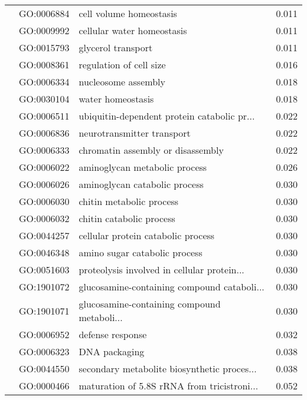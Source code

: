 \begin{longtable}{lllr}
   & GO:0006884 &                      cell volume homeostasis &         0.011 \\
   & GO:0009992 &                   cellular water homeostasis &         0.011 \\
   & GO:0015793 &                           glycerol transport &         0.011 \\
   & GO:0008361 &                      regulation of cell size &         0.016 \\
   & GO:0006334 &                          nucleosome assembly &         0.018 \\
   & GO:0030104 &                            water homeostasis &         0.018 \\
   & GO:0006511 &  ubiquitin-dependent protein catabolic pr... &         0.022 \\
   & GO:0006836 &                   neurotransmitter transport &         0.022 \\
   & GO:0006333 &            chromatin assembly or disassembly &         0.022 \\
   & GO:0006022 &                aminoglycan metabolic process &         0.026 \\
   & GO:0006026 &                aminoglycan catabolic process &         0.030 \\
   & GO:0006030 &                     chitin metabolic process &         0.030 \\
   & GO:0006032 &                     chitin catabolic process &         0.030 \\
   & GO:0044257 &           cellular protein catabolic process &         0.030 \\
   & GO:0046348 &                amino sugar catabolic process &         0.030 \\
   & GO:0051603 &  proteolysis involved in cellular protein... &         0.030 \\
   & GO:1901072 &  glucosamine-containing compound cataboli... &         0.030 \\
   & GO:1901071 &  glucosamine-containing compound metaboli... &         0.030 \\
   & GO:0006952 &                             defense response &         0.032 \\
   & GO:0006323 &                                DNA packaging &         0.038 \\
   & GO:0044550 &  secondary metabolite biosynthetic proces... &         0.038 \\
   & GO:0000466 &  maturation of 5.8S rRNA from tricistroni... &         0.052 \\

\end{longtable}
